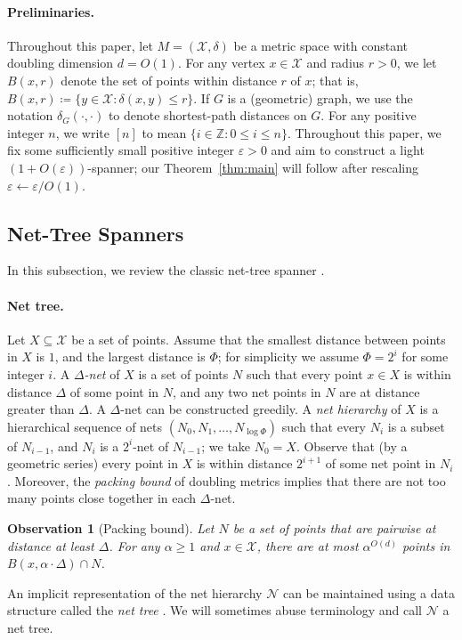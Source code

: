 \documentclass[11pt]{article}
\let\e\varepsilon               %
\def\Integer{\mathbb{Z}}
\let\Z\Integer
\def\set#1{\{ #1 \}}
\def\EMPH#1{\emph{\textcolor{BrickRed} {#1}}}
\newtheorem{observation}[theorem]{Observation}
\newcommand{\cX}{\mathcal{X}}
\newcommand{\cN}{\mathcal{N}}
\newcommand{\dist}{\ensuremath{\delta}}
\newcommand{\ddim}{\ensuremath{d}}
\begin{document}
\paragraph{Preliminaries.} Throughout this paper, let \EMPH{$M = (\cX, \dist)$} be a metric space with constant doubling dimension $\ddim = O(1)$.
For any vertex $x \in \cX$ and radius $r > 0$, we let \EMPH{$B(x, r)$} denote the set of points within distance $r$ of $x$; that is, $B(x,r) \coloneqq \set{y \in \cX : \dist(x,y) \le r}$.
If $G$ is a (geometric) graph, we use the notation \EMPH{$\dist_G(\cdot,\cdot)$} to denote shortest-path distances on $G$. For any positive integer $n$, we write \EMPH{$[n]$} to mean $\set{i \in \Z: 0 \le i \le n}$. Throughout this paper, we fix some sufficiently small positive integer \EMPH{$\e> 0$} and aim to construct a light $(1+O(\e))$-spanner; our Theorem~\ref{thm:main} will follow after rescaling $\e \gets \e / O(1)$.
%
\subsection{Net-Tree Spanners}
%
In this subsection, we review the classic net-tree spanner \cite{gao2004deformable}.
%
\paragraph{Net tree.}  Let $X \subseteq \cX$ be a set of points. Assume that the smallest distance between points in $X$ is $1$, and the largest distance is \EMPH{$\Phi$}; for simplicity we assume $\Phi = 2^i$ for some integer $i$.
A \EMPH{$\Delta$-net} of $X$ is a set of points $N$ such that every point $x \in X$ is within distance $\Delta$ of some point in $N$, and any two net points in $N$ are at distance greater than $\Delta$. A $\Delta$-net can be constructed greedily.
A \EMPH{net hierarchy} of $X$ is a hierarchical sequence of nets $(N_0, N_1, \ldots, N_{\log \Phi})$ such that every $N_i$ is a subset of $N_{i-1}$, and $N_i$ is a $2^{i}$-net of $N_{i-1}$;
we take $N_0 = X$. Observe that (by a geometric series) every point in $X$ is within distance $2^{i+1}$ of some net point in $N_i$. Moreover, the \emph{packing bound} of doubling metrics implies that there are not too many points close together in each $\Delta$-net.
\begin{observation}[Packing bound]
\label{obs:packing}
    Let $N$ be a set of points that are pairwise at distance at least $\Delta$. For any $\alpha \ge 1$ and $x \in \cX$, there are at most $\alpha^{O(\ddim)}$ points in $B(x,\alpha \cdot \Delta) \cap N$.
\end{observation}
% 
An implicit representation of the net hierarchy $\cN$ can be maintained using a data structure called the \EMPH{net tree} \cite{gao2004deformable,KL04,HM06}.
We will sometimes abuse terminology and call $\cN$ a net tree.
%
\end{document}
